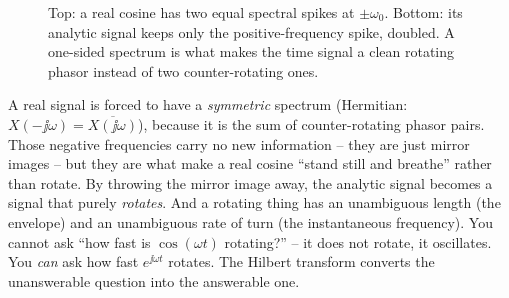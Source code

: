 \begin{figure}[H]
\centering
{}
\caption{Top: a real cosine has two equal spectral spikes at $\pm\omega_0$. Bottom: its
analytic signal keeps only the positive-frequency spike, doubled. A one-sided spectrum is
what makes the time signal a clean rotating phasor instead of two counter-rotating ones.}
\label{ch25:fig-onesided}
\end{figure}

\begin{happeningbox}
A real signal is forced to have
a \emph{symmetric} spectrum (Hermitian: $X(-\jj\omega)=\overline{X(\jj\omega)}$), because
it is the sum of counter-rotating phasor pairs. Those negative frequencies carry no new
information -- they are just mirror images -- but they are what make a real cosine
``stand still and breathe'' rather than rotate. By throwing the mirror image away, the
analytic signal becomes a signal that purely \emph{rotates}. And a rotating thing has an
unambiguous length (the envelope) and an unambiguous rate of turn (the instantaneous
frequency). You cannot ask ``how fast is $\cos(\omega t)$ rotating?'' -- it does not
rotate, it oscillates. You \emph{can} ask how fast $e^{\jj\omega t}$ rotates. The Hilbert
transform converts the unanswerable question into the answerable one.
\end{happeningbox}

